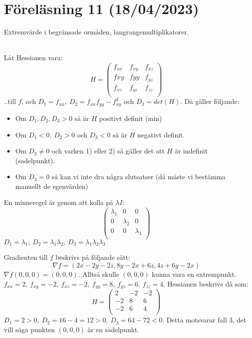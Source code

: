 \documentclass{report}
\begin{document}
\pagebreak
\section{Föreläsning 11 (18/04/2023)}
Extremvärde i begränsade ormåden, langrangemultiplikatorer.\\\\

{
	Låt Hessianen vara:
\begin{equation*}
H =
\begin{pmatrix}
	f_{xx} & f_{xy} & f_{xz} \\
	f{xy} & f{yy} & f_{yz} \\
	f_{xz} & f_{yz} & f_{zz} \\
\end{pmatrix}
\end{equation*}
..till $ f $, och $ D_1 = f_{xx},\: D_2 = f_{xx}f_{yy} - f_{xy}^2 $ och $ D_3 = det(H) $. Då gäller följande:
\begin{itemize}
	\item Om $ D_1, D_2, D_3 > 0 $ så är $ H $ positivt definit (min)
	\item Om $ D_1 < 0, \: D_2 > 0 $ och $ D_3 < 0 $ så är $ H $ negativt definit.
	\item Om $ D_3 \ne 0 $ och varken 1) eller 2) så gäller det att $ H $ är indefinit (sadelpunkt).
	\item Om $ D_3 = 0 $ så kan vi inte dra några slutsatser (då måste vi bestämma manuellt de egenvärden)
\end{itemize}
En minneregel är genom att kolla på $ \lambda I $:
\begin{equation*}
\begin{pmatrix}
	\lambda_1 & 0 & 0 \\
	0 & \lambda_2 & 0 \\
	0 & 0 & \lambda_3 \\
\end{pmatrix}
\end{equation*}
$ D_1 = \lambda_1, \: D_2 = \lambda_1 \lambda_2, \: D_3 = \lambda_1 \lambda_2 \lambda_3 $ 
	}

{
Gradienten till $ f $ beskrivs på följande sätt:
\begin{equation*}
\nabla f = (2x-2y-2z, 8y-2x+6z, 4z+6y-2x)
\end{equation*}
$ \nabla f(0,0,0) = (0,0,0) $. Alltså skulle $ (0,0,0) $ kunna vara en extrempunkt. $ f_{xx} = 2, \: f_{xy} = -2, \: f_{xz} = -2, \: f_{yy} = 8, \: f_{yz} = 6, \: f_{zz} = 4 $. Hessianen beskrivs då som:
\begin{equation*}
	H = 
\begin{pmatrix}
	2 & -2 & -2 \\
	-2 & 8 & 6 \\
	-2 & 6 & 4 \\
\end{pmatrix}
\end{equation*}
$ D_1 = 2 > 0, \: D_2 = 16 -4 = 12 > 0, \: D_3 = 64-72 < 0 $.
Detta motsvarar fall 3, det vill säga punkten $ (0,0,0) $ är en sadelpunkt.
}
\end{document}
